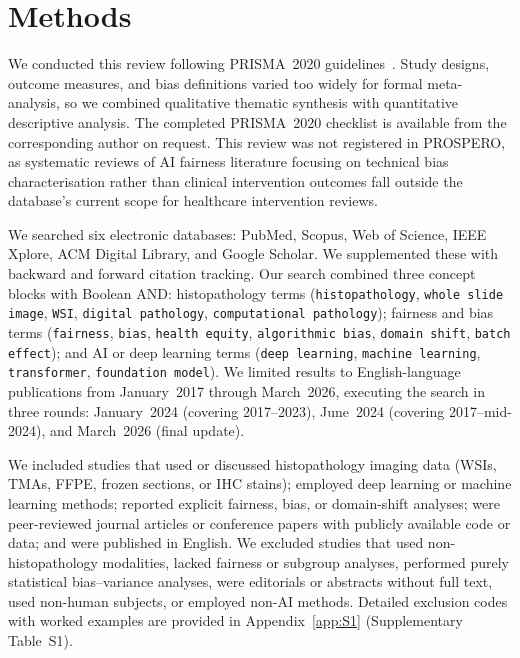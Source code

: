 
\section{Methods}
\label{sec:methods}
\label{sec:methods:protocol}

We conducted this review following PRISMA~2020
guidelines~\citep{prisma2020statement}. Study designs, outcome measures, and bias definitions varied too widely for formal meta-analysis, so we combined qualitative thematic synthesis with quantitative descriptive analysis. The completed PRISMA~2020 checklist is available from the corresponding author on request. This review was not registered in PROSPERO, as systematic reviews of AI fairness literature focusing on technical bias characterisation rather than clinical intervention outcomes fall outside the database's current scope for healthcare intervention reviews.

\label{sec:methods:search}
We searched six electronic databases: PubMed, Scopus, Web of Science,
IEEE Xplore, ACM Digital Library, and Google Scholar. We supplemented these with backward
and forward citation tracking. Our search combined
three concept blocks with Boolean AND: histopathology terms
(\texttt{histopathology}, \texttt{whole slide image}, \texttt{WSI},
\texttt{digital pathology}, \texttt{computational pathology});
fairness and bias terms (\texttt{fairness}, \texttt{bias},
\texttt{health equity}, \texttt{algorithmic bias}, \texttt{domain shift},
\texttt{batch effect}); and AI or deep learning terms
(\texttt{deep learning}, \texttt{machine learning}, \texttt{transformer},
\texttt{foundation model}). We limited results to English-language
publications from January~2017 through March~2026, executing the search in three
rounds: January~2024 (covering 2017--2023), June~2024 (covering 2017--mid-2024), and March~2026 (final update).

\label{sec:methods:eligibility}
We included studies that used or discussed histopathology
imaging data (WSIs, TMAs, FFPE, frozen sections, or IHC stains);
employed deep learning or machine learning methods;
reported explicit fairness, bias, or domain-shift analyses;
were peer-reviewed journal articles or conference papers with
publicly available code or data; and were published in
English.
We excluded studies that used non-histopathology modalities, lacked
fairness or subgroup analyses, performed purely statistical bias--variance
analyses, were editorials or abstracts without full text, used non-human subjects,
or employed non-AI methods. Detailed exclusion codes with worked examples are provided in Appendix~\ref{app:S1} (Supplementary Table~S1).

